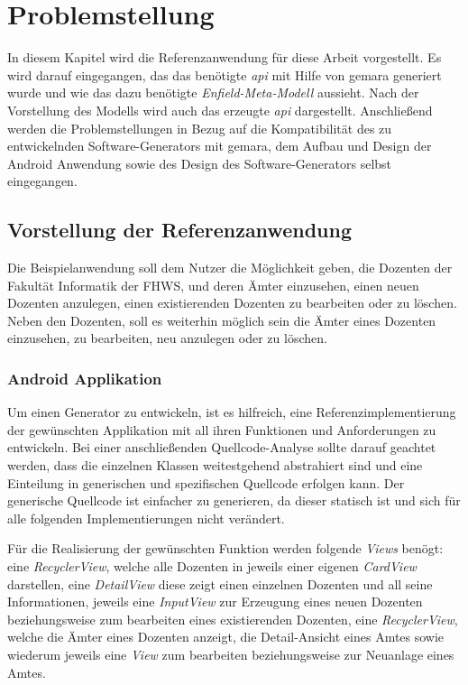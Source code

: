 \chapter{Problemstellung} \label{ch:problem}
In diesem Kapitel wird die Referenzanwendung für diese Arbeit vorgestellt. Es wird darauf eingegangen, das das benötigte \textit{\acf{api}} mit Hilfe von \acf{gemara} generiert wurde und wie das dazu benötigte \textit{Enfield-Meta-Modell} aussieht. Nach der Vorstellung des Modells wird auch das erzeugte \textit{\acf{api}} dargestellt. Anschließend werden die Problemstellungen in Bezug auf die Kompatibilität des zu entwickelnden Software-Generators mit \ac{gemara}, dem Aufbau und Design der Android Anwendung sowie des Design des Software-Generators selbst eingegangen.

\section{Vorstellung der Referenzanwendung}
Die Beispielanwendung soll dem Nutzer die Möglichkeit geben, die Dozenten der Fakultät Informatik der FHWS, und deren Ämter einzusehen, einen neuen Dozenten anzulegen, einen existierenden Dozenten zu bearbeiten oder zu löschen. Neben den Dozenten, soll es weiterhin möglich sein die Ämter eines Dozenten einzusehen, zu bearbeiten, neu anzulegen oder zu löschen.

\subsection{Android Applikation}\label{sec:ref_impl}
Um einen Generator zu entwickeln, ist es hilfreich, eine Referenzimplementierung der gewünschten Applikation mit all ihren Funktionen und Anforderungen zu entwickeln. Bei einer anschließenden Quellcode-Analyse sollte darauf geachtet werden, dass die einzelnen Klassen weitestgehend abstrahiert sind und eine Einteilung in generischen und spezifischen Quellcode erfolgen kann. Der generische Quellcode ist einfacher zu generieren, da dieser statisch ist und sich für alle folgenden Implementierungen nicht verändert. 

Für die Realisierung der gewünschten Funktion werden folgende \textit{Views} benögt: eine \textit{RecyclerView}, welche alle Dozenten in jeweils einer eigenen \textit{CardView} darstellen, eine \textit{DetailView} diese zeigt einen einzelnen Dozenten und all seine Informationen, jeweils eine \textit{InputView} zur Erzeugung eines neuen Dozenten beziehungsweise zum bearbeiten eines existierenden Dozenten, eine \textit{RecyclerView}, welche die Ämter eines Dozenten anzeigt, die Detail-Ansicht eines Amtes sowie wiederum jeweils eine \textit{View} zum bearbeiten beziehungsweise zur Neuanlage eines Amtes.

